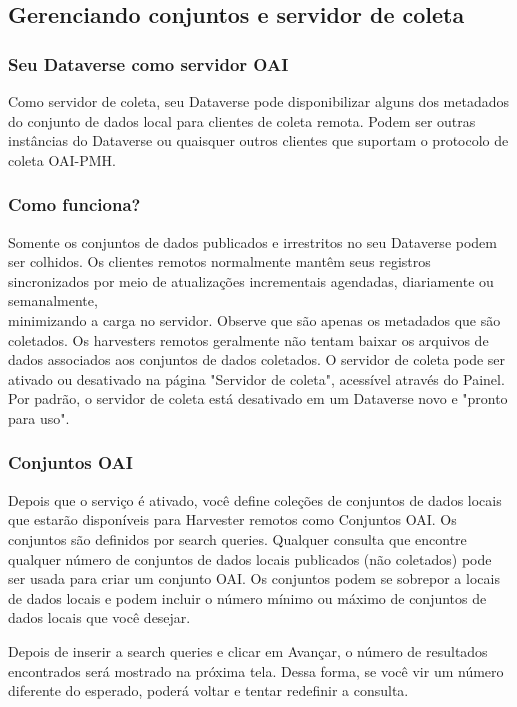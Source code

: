 \documentclass[12pt,hidelinks]{article}
\begin{document}
\subsection{Gerenciando conjuntos e servidor de coleta}

\subsubsection{Seu Dataverse como servidor OAI}

\qquad Como servidor de coleta, seu Dataverse pode disponibilizar alguns dos metadados do conjunto de dados local para clientes de coleta remota. Podem ser outras instâncias do Dataverse ou quaisquer outros clientes que suportam o protocolo de coleta OAI-PMH.

\subsubsection{Como funciona?}

\qquad Somente os conjuntos de dados publicados e irrestritos no seu Dataverse podem ser colhidos. Os clientes remotos normalmente mantêm seus registros sincronizados por meio de atualizações incrementais agendadas, diariamente ou semanalmente, \\minimizando a carga no servidor. Observe que são apenas os metadados que são coletados. Os harvesters remotos geralmente não tentam baixar os arquivos de dados associados aos conjuntos de dados coletados.
O servidor de coleta pode ser ativado ou desativado na página "Servidor de coleta", acessível através do Painel. Por padrão, o servidor de coleta está desativado em um Dataverse novo e "pronto para uso".

\subsubsection{Conjuntos OAI}

\qquad Depois que o serviço é ativado, você define coleções de conjuntos de dados locais que estarão disponíveis para Harvester remotos como Conjuntos OAI. Os conjuntos são definidos por search queries. Qualquer consulta que encontre qualquer número de conjuntos de dados locais publicados (não coletados) pode ser usada para criar um conjunto OAI. Os conjuntos podem se sobrepor a locais de dados locais e podem incluir o número mínimo ou máximo de conjuntos de dados locais que você desejar.

Depois de inserir a search queries e clicar em Avançar, o número de resultados encontrados será mostrado na próxima tela. Dessa forma, se você vir um número diferente do esperado, poderá voltar e tentar redefinir a consulta.\\
\end{document}
